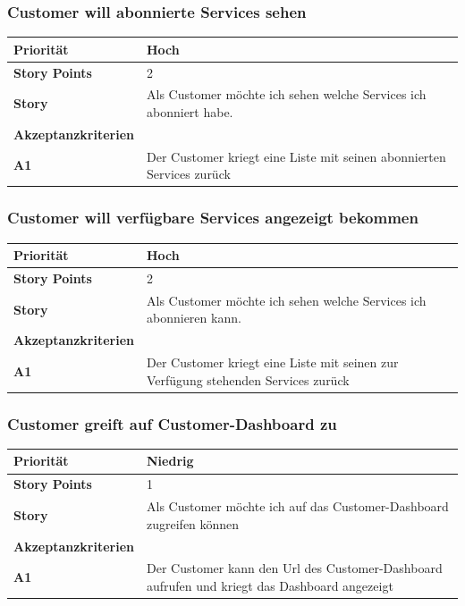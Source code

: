 \documentclass[11pt]{scrartcl}
\begin{document}
\subsubsection{Customer will abonnierte Services sehen}
\begin{tabularx}{\linewidth}{l X}
  \textbf{Priorität} & Hoch\\
  \hline
  \textbf{Story Points} & 2\\
  \hline
  \textbf{Story}& Als Customer möchte ich sehen welche Services ich abonniert habe.\\
  \hline
    \textbf{Akzeptanzkriterien} & \\
    \hline
  \textbf{A1} & Der Customer kriegt eine Liste mit seinen abonnierten Services zurück\\
  \hline
   \end{tabularx}
   
\subsubsection{Customer will verfügbare Services angezeigt bekommen}
\begin{tabularx}{\linewidth}{l X}
  \textbf{Priorität} & Hoch\\
  \hline
  \textbf{Story Points} & 2\\
  \hline
  \textbf{Story}& Als Customer möchte ich sehen welche Services ich abonnieren kann.\\
  \hline
    \textbf{Akzeptanzkriterien} & \\
    \hline
  \textbf{A1} & Der Customer kriegt eine Liste mit seinen zur Verfügung stehenden Services zurück\\
  \hline
   \end{tabularx}

\subsubsection{Customer greift auf Customer-Dashboard zu}
\begin{tabularx}{\linewidth}{l X}
  \textbf{Priorität} & Niedrig\\
  \hline
  \textbf{Story Points} & 1\\
  \hline
  \textbf{Story}& Als Customer möchte ich auf das Customer-Dashboard zugreifen können\\
  \hline
    \textbf{Akzeptanzkriterien} & \\
    \hline
  \textbf{A1} & Der Customer kann den Url des Customer-Dashboard aufrufen und 
  kriegt das Dashboard angezeigt\\
  \hline
   \end{tabularx}
   
\end{document}

